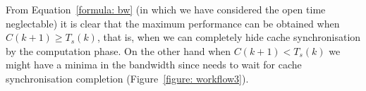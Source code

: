 From Equation~\ref{formula: bw} (in which we have considered the open time neglectable) it is clear that the maximum performance can be obtained when $C(k+1) \geq T_s(k)$, that is, when we can completely hide cache synchronisation by the computation phase. On the other hand when $C(k+1) < T_s(k)$ we might have a minima in the bandwidth since  needs to wait for cache synchronisation completion (Figure~\ref{figure: workflow3}). 

